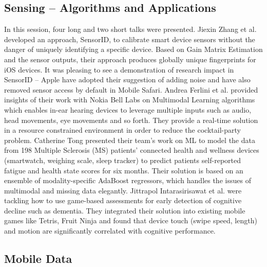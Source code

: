 \documentclass[conference]{IEEEtran}
\begin{document}
\subsection{Sensing -- Algorithms and Applications }

In this session, four long and two short talks were presented. Jiexin Zhang et al. developed an approach, SensorID, to calibrate smart device sensors without the danger of uniquely identifying a specific device. Based on Gain Matrix Estimation and the sensor outputs, their approach produces globally unique fingerprints for iOS devices. It was pleasing to see a demonstration of research impact in SensorID -- Apple have adopted their suggestion of adding noise and have also removed sensor access by default in Mobile Safari.
Andrea Ferlini et al. provided insights of their work with Nokia Bell Labs on Multimodal Learning algorithms which enables in-ear hearing devices to leverage multiple inputs such as audio, head movements, eye movements and so forth. They provide a real-time solution in a resource constrained environment in order to reduce the cocktail-party problem.
Catherine Tong presented their team’s work on ML to model the data from 198 Multiple Sclerosis (MS) patients’ connected health and wellness devices (smartwatch, weighing scale, sleep tracker) to predict patients self-reported fatigue and health state scores for six months. Their solution is based on an ensemble of modality-specific AdaBoost regressors, which handles the issues of multimodal and missing data elegantly. 
Jittrapol Intarasirisawat et al. were tackling how to use game-based assessments for early detection of cognitive decline such as dementia. They integrated their solution into existing mobile games like Tetris, Fruit Ninja and found that device touch (swipe speed, length) and motion are significantly correlated with cognitive performance.


\subsection{Mobile Data}
\end{document}
